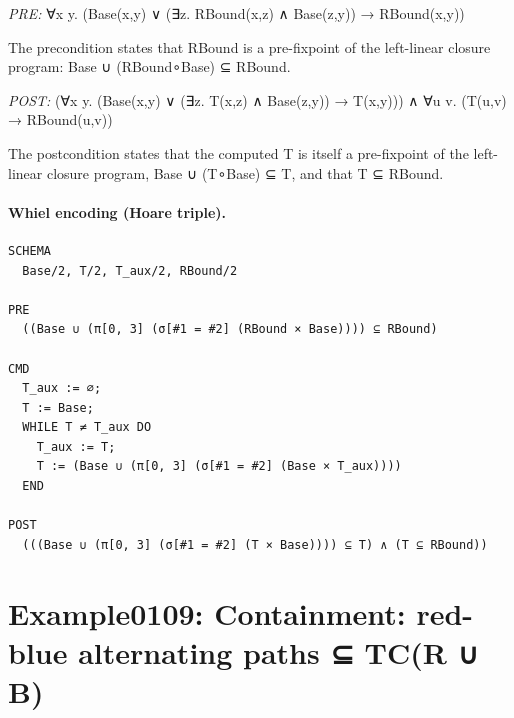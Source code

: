 \documentclass[10pt]{article}
\begin{document}
\textit{PRE:} ∀x y. (Base(x,y) ∨ (∃z. RBound(x,z) ∧ Base(z,y)) → RBound(x,y))\par The precondition states that RBound is a pre-fixpoint of the left-linear closure program: Base ∪ (RBound∘Base) ⊆ RBound.

\textit{POST:} (∀x y. (Base(x,y) ∨ (∃z. T(x,z) ∧ Base(z,y)) → T(x,y))) ∧ ∀u v. (T(u,v) → RBound(u,v))\par The postcondition states that the computed T is itself a pre-fixpoint of the left-linear closure program, Base ∪ (T∘Base) ⊆ T, and that T ⊆ RBound.

\paragraph{Whiel encoding (Hoare triple).}

\begin{Verbatim}[fontsize=\scriptsize,breaklines=true,breakanywhere=true,frame=single,framesep=1.5mm]
SCHEMA
  Base/2, T/2, T_aux/2, RBound/2

PRE
  ((Base ∪ (π[0, 3] (σ[#1 = #2] (RBound × Base)))) ⊆ RBound)

CMD
  T_aux := ∅;
  T := Base;
  WHILE T ≠ T_aux DO
    T_aux := T;
    T := (Base ∪ (π[0, 3] (σ[#1 = #2] (Base × T_aux))))
  END

POST
  (((Base ∪ (π[0, 3] (σ[#1 = #2] (T × Base)))) ⊆ T) ∧ (T ⊆ RBound))
\end{Verbatim}

\Needspace{0.45\textheight}

\section{Example0109: Containment: red-blue alternating paths ⊆ TC(R ∪ B)}\label{case:Example0109}
\end{document}
